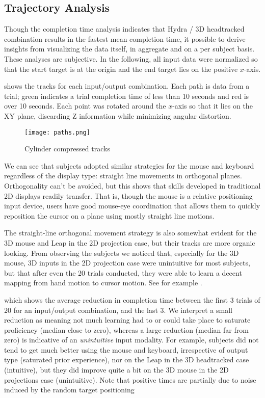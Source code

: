 \subsection{Trajectory Analysis}\label{sec:trajectory}

Though the completion time analysis indicates that Hydra / 3D headtracked
combination results in the fastest mean completion time, it possible to derive
insights from visualizing the data itself, in aggregate and on a per subject
basis.  These analyses are subjective.  In the following, all input data were
normalized so that the start target is at the origin and the end target lies
on the positive $x$-axis.

 shows the tracks for each input/output
combination. Each path is data from a trial; green indicates a trial
completion time of less than 10 seconds and red is over 10 seconds.  Each
point was rotated around the $x$-axis so that it lies on the XY plane,
discarding Z information while minimizing angular distortion.

\begin{figure}
    \centering
    \texttt{[image: paths.png]}
    \caption{Cylinder compressed tracks}
    \label{fig:compressedtracks}
\end{figure}

We can see that subjects adopted similar strategies for the mouse and keyboard
regardless of the display type: straight line movements in orthogonal planes.
Orthogonality can't be avoided, but this shows that skills developed in
traditional 2D displays readily transfer.  That is, though the mouse is a
relative positioning input device, users have good mouse-eye coordination that
allows them to quickly reposition the cursor on a plane using mostly straight
line motions.

The straight-line orthogonal movement strategy is also somewhat evident for
the 3D mouse and Leap in the 2D projection case, but their tracks are more
organic looking.  From observing the subjects we noticed that, especially for
the 3D mouse, 3D inputs in the 2D projection case were unintuitive for most
subjects, but that after even the 20 trials conducted, they were able to learn
a decent mapping from hand motion to cursor motion.  See for example
.

 which shows the average reduction in completion time
between the first 3 trials of 20 for an input/output combination, and the last
3.  We interpret a small reduction as meaning not much learning had to or
could take place to saturate proficiency (median close to zero), whereas a
large reduction (median far from zero) is indicative of an \emph{unintuitive}
input modality.  For example, subjects did not tend to get much better using
the mouse and keyboard, irrespective of output type (saturated prior
experience), nor on the Leap in the 3D headtracked case (intuitive), but they
did improve quite a bit on the 3D mouse in the 2D projections case
(unintuitive).  Note that positive times are partially due to noise induced by
the random target positioning

